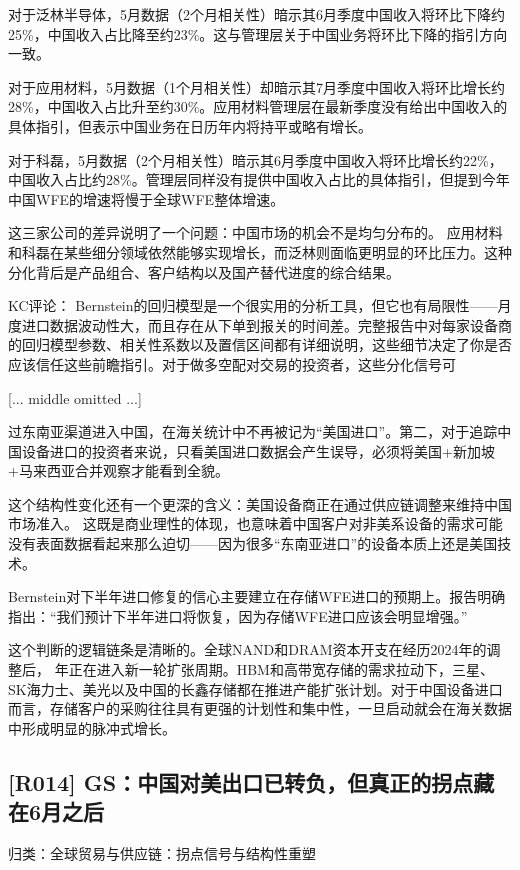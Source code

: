 \documentclass[11pt]{ctexart}
\begin{document}
对于泛林半导体，5月数据（2个月相关性）暗示其6月季度中国收入将环比下降约25\%，中国收入占比降至约23\%。这与管理层关于中国业务将环比下降的指引方向一致。

对于应用材料，5月数据（1个月相关性）却暗示其7月季度中国收入将环比增长约28\%，中国收入占比升至约30\%。应用材料管理层在最新季度没有给出中国收入的具体指引，但表示中国业务在日历年内将持平或略有增长。

对于科磊，5月数据（2个月相关性）暗示其6月季度中国收入将环比增长约22\%，中国收入占比约28\%。管理层同样没有提供中国收入占比的具体指引，但提到今年中国WFE的增速将慢于全球WFE整体增速。

这三家公司的差异说明了一个问题：中国市场的机会不是均匀分布的。 应用材料和科磊在某些细分领域依然能够实现增长，而泛林则面临更明显的环比压力。这种分化背后是产品组合、客户结构以及国产替代进度的综合结果。

KC评论： Bernstein的回归模型是一个很实用的分析工具，但它也有局限性——月度进口数据波动性大，而且存在从下单到报关的时间差。完整报告中对每家设备商的回归模型参数、相关性系数以及置信区间都有详细说明，这些细节决定了你是否应该信任这些前瞻指引。对于做多空配对交易的投资者，这些分化信号可

[... middle omitted ...]

过东南亚渠道进入中国，在海关统计中不再被记为“美国进口”。第二，对于追踪中国设备进口的投资者来说，只看美国进口数据会产生误导，必须将美国+新加坡+马来西亚合并观察才能看到全貌。

这个结构性变化还有一个更深的含义：美国设备商正在通过供应链调整来维持中国市场准入。 这既是商业理性的体现，也意味着中国客户对非美系设备的需求可能没有表面数据看起来那么迫切——因为很多“东南亚进口”的设备本质上还是美国技术。

Bernstein对下半年进口修复的信心主要建立在存储WFE进口的预期上。报告明确指出：“我们预计下半年进口将恢复，因为存储WFE进口应该会明显增强。”

这个判断的逻辑链条是清晰的。全球NAND和DRAM资本开支在经历2024年的调整后， 年正在进入新一轮扩张周期。HBM和高带宽存储的需求拉动下，三星、SK海力士、美光以及中国的长鑫存储都在推进产能扩张计划。对于中国设备进口而言，存储客户的采购往往具有更强的计划性和集中性，一旦启动就会在海关数据中形成明显的脉冲式增长。

\subsection{[R014] GS：中国对美出口已转负，但真正的拐点藏在6月之后}
{\small\color{refgray}归类：全球贸易与供应链：拐点信号与结构性重塑}
\end{document}
